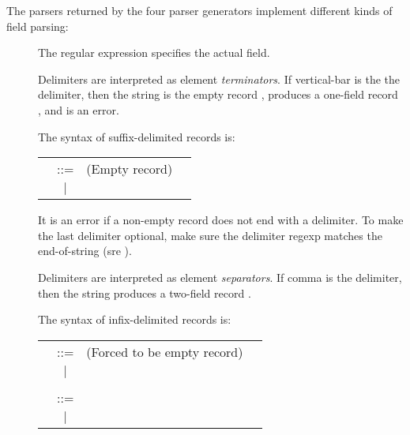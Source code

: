 \begin{desc}
    The parsers returned by the four parser generators implement different
    kinds of field parsing:
    \begin{description}
    \item[]
    The regular expression specifies the actual field.


    \item[]
    Delimiters are interpreted as element \emph{terminators}. 
    If vertical-bar is the the delimiter, then the string 
    is the empty record \ex{()},  produces a one-field record
    , and  is an error.

    The syntax of suffix-delimited records is:
        \begin{inset}
        \begin{tabular}{lcll}
        \synvar{record} & ::=  & \ex{""} \qquad (Empty record) \\
                        &  $|$ & \synvar{element} \synvar{delim} 
                                 \synvar{record}
        \end{tabular}
        \end{inset}

    It is an error if a non-empty record does not end with a delimiter.
    To make the last delimiter optional, make sure the delimiter regexp
    matches the end-of-string (sre ).

    \item []
    Delimiters are interpreted as element \emph{separators}. If comma is the
    delimiter, then the string  produces a two-field 
    record .

    The syntax of infix-delimited records is:
        \begin{inset}
        \begin{tabular}{lcll}
        \synvar{record} & ::=  & \ex{""} \qquad (Forced to be empty record) \\
                        &  $|$ & \synvar{real-infix-record} \\
        \\
        \synvar{real-infix-record} & ::=  & \synvar{element} \synvar{delim}
                                            \synvar{real-infix-record} \\
                                    & $|$ & \synvar{element}
        \end{tabular}
        \end{inset}


\end{description}
\end{desc}

